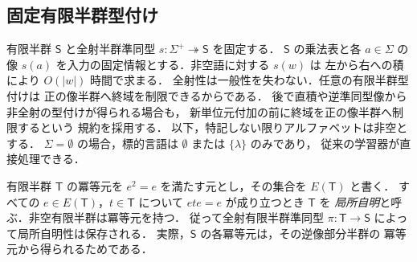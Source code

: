 \documentclass[11pt,a4paper]{ltjsarticle}
\theoremstyle{remark}
\theoremstyle{plain}
\begin{document}
\subsection{固定有限半群型付け}\label{sec:fixed-typing}
有限半群 $\mathsf S$ と全射半群準同型
$s:\Sigma^+\twoheadrightarrow\mathsf S$ を固定する．
$\mathsf S$ の乗法表と各 $a\in\Sigma$ の像
$s(a)$ を入力の固定情報とする．非空語に対する $s(w)$ は
左から右への積により $O(|w|)$ 時間で求まる．
全射性は一般性を失わない．任意の有限半群型付けは
正の像半群へ終域を制限できるからである．
後で直積や逆準同型像から非全射の型付けが得られる場合も，
新単位元付加の前に終域を正の像半群へ制限するという
規約を採用する．
以下，特記しない限りアルファベットは非空とする．
$\Sigma=\emptyset$ の場合，標的言語は
$\emptyset$ または $\{\lambda\}$ のみであり，
従来の学習器が直接処理できる．

有限半群 $\mathsf T$ の冪等元を
$e^2=e$ を満たす元とし，その集合を $E(\mathsf T)$ と書く．
すべての $e\in E(\mathsf T)$，$t\in\mathsf T$ について
$ete=e$ が成り立つとき $\mathsf T$ を
\emph{局所自明}と呼ぶ．非空有限半群は冪等元を持つ．
従って全射有限半群準同型
$\pi:\mathsf T\to\mathsf S$ によって局所自明性は保存される．
実際，$\mathsf S$ の各冪等元は，その逆像部分半群の
冪等元から得られるためである．
\end{document}
